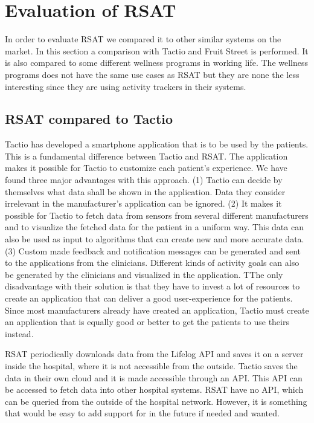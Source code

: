 \documentclass{cslthse-msc}
\begin{document}

\section{Evaluation of RSAT}

In order to evaluate RSAT we compared it to other similar systems on the market. In this section a comparison with Tactio and Fruit Street is performed. It is also compared to some different wellness programs in working life. The wellness programs does not have the same use cases as RSAT but they are none the less interesting since they are using activity trackers in their systems.

\subsection{RSAT compared to Tactio}

Tactio has developed a smartphone application that is to be used by the patients. This is a fundamental difference between Tactio and RSAT. The application makes it possible for Tactio to customize each patient’s experience. We have found three major advantages with this approach. (1) Tactio can decide by themselves what data 
shall be shown in the application. Data they consider irrelevant in the manufacturer’s application can be ignored. (2) It makes it possible for Tactio to fetch data from sensors from several different manufacturers and to visualize the fetched data for the patient in a uniform way. This data can also be used as input to algorithms that can create new and more accurate data. (3) Custom made feedback and notification messages can be generated and sent to the applications from the clinicians. Different kinds of activity goals can also be generated by the clinicians and visualized in the application. TThe only disadvantage with their solution is that they have to invest a lot of resources to create an application that can deliver a good user-experience for the patients. Since most manufacturers already have created an application, Tactio must create an application that is equally good or better to get the patients to use theirs instead. 

RSAT periodically downloads data from the Lifelog API and saves it on a server inside the hospital, where it is not accessible from the outside. Tactio saves the data in their own cloud and it is made accessible through an API. This API can be accessed to fetch data into other hospital systems. RSAT have no API, which can be queried from the outside of the hospital network. However, it is something that would be easy to add support for in the future if needed and wanted.  
\end{document}
